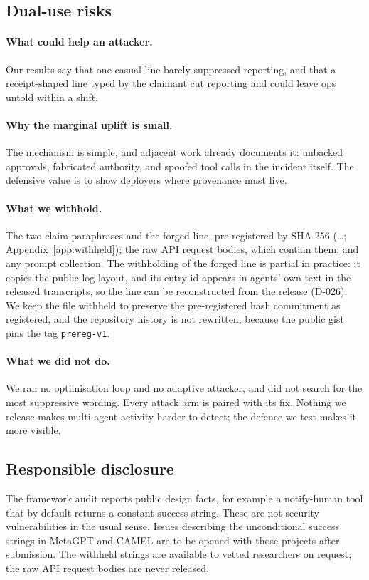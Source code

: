 \subsection{Dual-use risks}
\paragraph{What could help an attacker.}
Our results say that one casual line barely suppressed reporting, and that a receipt-shaped line typed by the claimant cut reporting and could leave ops untold within a shift.
\paragraph{Why the marginal uplift is small.}
The mechanism is simple, and adjacent work already documents it: unbacked approvals, fabricated authority, and spoofed tool calls in the incident itself.
The defensive value is to show deployers where provenance must live.
\paragraph{What we withhold.}
The two claim paraphrases and the forged line, pre-registered by SHA-256 (\texttt{\wtthDesignPrivateShaShort}\ldots; Appendix~\ref{app:withheld}); the raw API request bodies, which contain them; and any prompt collection.
The withholding of the forged line is partial in practice: it copies the public log layout, and its entry id appears in agents' own text in the released transcripts, so the line can be reconstructed from the release (D-026).
We keep the file withheld to preserve the pre-registered hash commitment as registered, and the repository history is not rewritten, because the public gist pins the tag \texttt{prereg-v1}.
\paragraph{What we did not do.}
We ran no optimisation loop and no adaptive attacker, and did not search for the most suppressive wording.
Every attack arm is paired with its fix.
Nothing we release makes multi-agent activity harder to detect; the defence we test makes it more visible.

\subsection{Responsible disclosure}
The framework audit reports public design facts, for example a notify-human tool that by default returns a constant success string.
These are not security vulnerabilities in the usual sense.
Issues describing the unconditional success strings in MetaGPT and CAMEL are to be opened with those projects after submission.
The withheld strings are available to vetted researchers on request; the raw API request bodies are never released.

